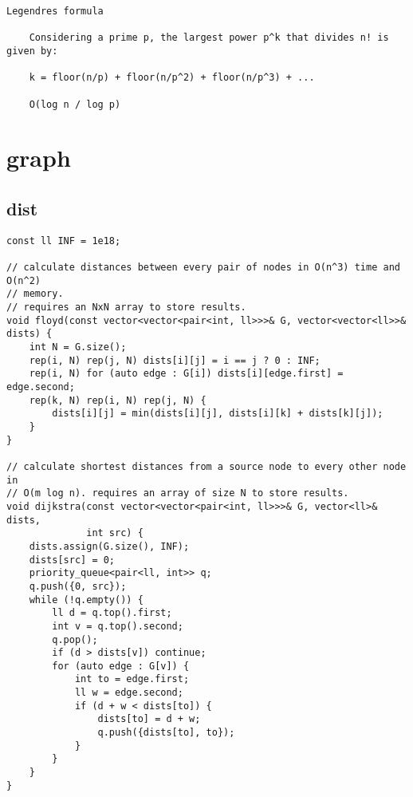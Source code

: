 \documentclass[twoside]{article}
\begin{document}
\begin{multicols*}{2}
\begin{verbatim}
Legendres formula

    Considering a prime p, the largest power p^k that divides n! is given by:
    
    k = floor(n/p) + floor(n/p^2) + floor(n/p^3) + ...

    O(log n / log p)

\end{verbatim}

{
[\vspace{2em}]
\section*{graph}
}
{
\subsection*{dist}
}
\begin{verbatim}
const ll INF = 1e18;

// calculate distances between every pair of nodes in O(n^3) time and O(n^2)
// memory.
// requires an NxN array to store results.
void floyd(const vector<vector<pair<int, ll>>>& G, vector<vector<ll>>& dists) {
    int N = G.size();
    rep(i, N) rep(j, N) dists[i][j] = i == j ? 0 : INF;
    rep(i, N) for (auto edge : G[i]) dists[i][edge.first] = edge.second;
    rep(k, N) rep(i, N) rep(j, N) {
        dists[i][j] = min(dists[i][j], dists[i][k] + dists[k][j]);
    }
}

// calculate shortest distances from a source node to every other node in
// O(m log n). requires an array of size N to store results.
void dijkstra(const vector<vector<pair<int, ll>>>& G, vector<ll>& dists,
              int src) {
    dists.assign(G.size(), INF);
    dists[src] = 0;
    priority_queue<pair<ll, int>> q;
    q.push({0, src});
    while (!q.empty()) {
        ll d = q.top().first;
        int v = q.top().second;
        q.pop();
        if (d > dists[v]) continue;
        for (auto edge : G[v]) {
            int to = edge.first;
            ll w = edge.second;
            if (d + w < dists[to]) {
                dists[to] = d + w;
                q.push({dists[to], to});
            }
        }
    }
}
\end{verbatim}


\end{multicols*}
\end{document}
